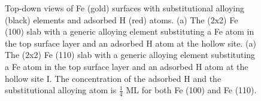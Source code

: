 \newpage
\begingroup
\begin{figure}[!ht]
  \centering
  \label{Chap:Mg_H:fig:3a}
  \label{Chap:Mg_H:fig:3b}
\caption[Top-down views of Fe surfaces with substitutional alloying elements and adsorbed H atoms]{Top-down views of Fe (gold) surfaces with substitutional alloying (black) elements and adsorbed H (red) atoms. (a) The (2x2) Fe (100) slab with a generic alloying element substituting a Fe atom in the top surface layer and an adsorbed H atom at the hollow site. (a) The (2x2) Fe (110) slab with a generic alloying element substituting a Fe atom in the top surface layer and an adsorbed H atom at the hollow site I. The concentration of the adsorbed H and the substitutional alloying atom is $\frac{1}{4}$ \ac{ML} for both Fe (100) and Fe (110).}
  \label{Chap:Mg_H:fig3}
\end{figure}
\endgroup